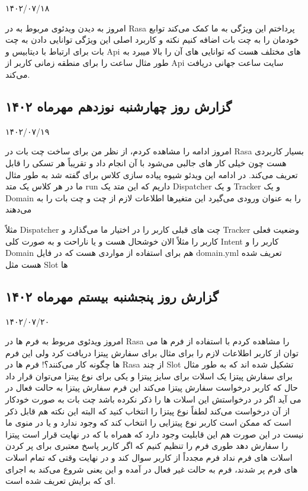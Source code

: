 ۱۴۰۲/۰۷/۱۸

امروز به دیدن ویدئوی مربوط به  در Rasa پرداختم این ویژگی به ما کمک می‌کند توابع خودمان را به چت بات اضافه کنیم نکته و کاربرد اصلی این ویژگی توانایی دادن به چت بات برای ارتباط با دیتابیس و Api های مختلف هست که توانایی های آن را بالا میبرد به طور مثال ساعت را برای منطقه زمانی کاربر از Api سایت ساعت جهانی دریافت می‌کند.


\subsection{گزارش روز چهارشنبه نوزدهم مهرماه ۱۴۰۲}

۱۴۰۲/۰۷/۱۹

امروز ادامه  را مشاهده کردم، از نظر من برای ساخت چت بات  در Rasa بسیار کاربردی هست چون خیلی کار های جالبی می‌شود با آن انجام داد و تقریباً هر تسکی را قابل تعریف می‌کند. در ادامه این ویدئو شیوه پیاده سازی کلاس برای  گفته شد به طور مثال ما در هر کلاس یک متد run داریم که این متد یک Dispatcher و یک Tracker و یک Domain را به عنوان ورودی می‌گیرد این متغیرها اطلاعات لازم از چت و چت بات را به  می‌دهند

مثلاً Dispatcher چت های قبلی کاربر را در اختیار ما می‌گذارد و Tracker وضعیت فعلی کاربر را مثلاً الان خوشحال هست و یا ناراحت و به صورت کلی Intent کاربر را و Domain هم برای استفاده از مواردی هست که در فایل domain.yml تعریف شده هست مثل Slot ها



\subsection{گزارش روز پنجشنبه بیستم مهرماه ۱۴۰۲}

۱۴۰۲/۰۷/۲۰

امروز ویدئوی مربوط به فرم ها در Rasa را مشاهده کردم با استفاده از فرم ها می توان از کاربر اطلاعات لازم را برای مثال برای سفارش پیتزا دریافت کرد ولی این فرم ها چگونه کار می‌کنند؟! فرم ها در Rasa از چند Slot تشکیل شده اند که به طور مثال برای سفارش پیتزا یک اسلات برای سایز پیتزا و یکی برای نوع پیتزا می‌توان قرار داد حال که کاربر درخواست سفارش پیتزا می‌کند این فرم سفارش پیتزا به حالت فعال در می آید اگر در درخواستش این اسلات ها را ذکر نکرده باشد چت بات به صورت خودکار از آن درخواست می‌کند لطفاً نوع پیتزا را انتخاب کنید که البته این نکته هم قابل ذکر است که ممکن است کاربر نوع پیتزایی را انتخاب کند که وجود ندارد و یا در منوی ما نیست در این صورت هم این قابلیت وجود دارد که همراه با  که در نهایت قرار است پیتزا را سفارش دهد طوری فرم را تنظیم کنیم که اگر کاربر پاسخ معتبری برای پر کردن اسلات های فرم نداد فرم مجدداً از کاربر سوال کند و در نهایت وقتی که تمام اسلات های فرم پر شدند، فرم به حالت غیر فعال در آمده و این یعنی شروع می‌کند به اجرای   ای که برایش تعریف شده است.


